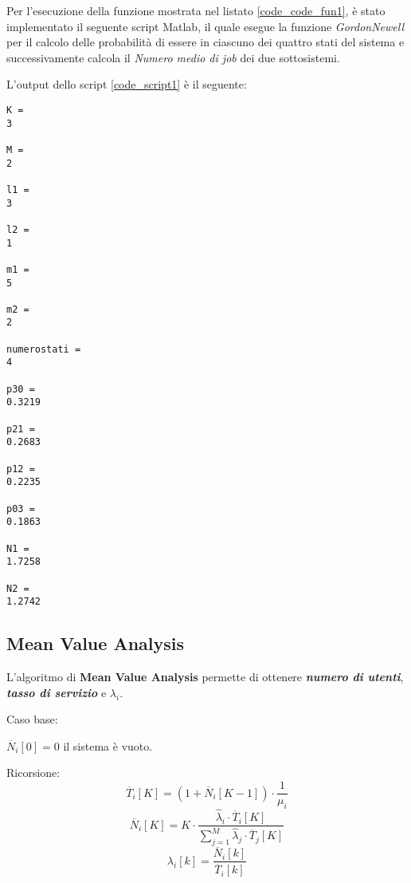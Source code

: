 Per l'esecuzione della funzione mostrata nel listato \ref{code_code_fun1}, è stato implementato
il seguente script Matlab, il quale esegue la funzione \textit{GordonNewell}
per il calcolo delle probabilità di essere in ciascuno dei quattro stati del sistema
e successivamente calcola il \textit{Numero medio di job} dei due sottosistemi.\\

\clearpage



\vspace{0.4cm}
L'output dello script \ref{code_script1} è il seguente:

\color{black} \begin{verbatim}
K =
3

M =
2

l1 =
3

l2 =
1

m1 =
5

m2 =
2

numerostati =
4

p30 =
0.3219

p21 =
0.2683

p12 =
0.2235

p03 =
0.1863

N1 =
1.7258

N2 =
1.2742
\end{verbatim} \color{black}

\subsection{Mean Value Analysis}
L'algoritmo di \textbf{Mean Value Analysis} permette di ottenere \textbf{\textit{numero di utenti}},
\textbf{\textit{tasso di servizio}} e \textbf{\textit{$\lambda_i$}}.

\vspace{0.3cm}

Caso base:\\
 \begin{center}
   $\overline{N}_i[0]=0  $ il sistema è vuoto.
 \end{center}

\vspace{0.2cm}

Ricorsione:
$$ \overline{T}_i[K]=(1+\overline{N}_i[K-1])\cdot \frac{1}{\mu_i}$$
$$ \overline{N}_i[K]=K\cdot \frac{\widehat{\lambda}_i\cdot \overline{T}_i[K]}{\sum_{j=1}^M \widehat{\lambda}_j \cdot \overline{T}_j[K]}$$
$$ \lambda_i[k]=\frac{\overline{N}_i[k]}{\overline{T}_i[k]}$$
\clearpage
